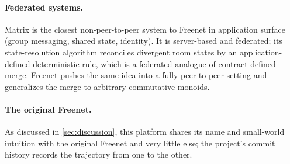 \paragraph{Federated systems.} Matrix \citep{matrix} is the closest non-peer-to-peer system to Freenet in application surface (group messaging, shared state, identity). It is server-based and federated; its state-resolution algorithm reconciles divergent room states by an application-defined deterministic rule, which is a federated analogue of contract-defined merge. Freenet pushes the same idea into a fully peer-to-peer setting and generalizes the merge to arbitrary commutative monoids.

\paragraph{The original Freenet.} As discussed in \cref{sec:discussion}, this platform shares its name and small-world intuition with the original Freenet \citep{clarke2001freenet} and very little else; the project's commit history records the trajectory from one to the other.
